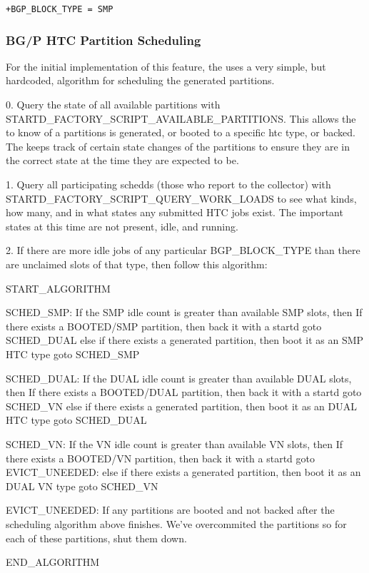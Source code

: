\begin{verbatim}
+BGP_BLOCK_TYPE = SMP
\end{verbatim}

\subsubsection{BG/P HTC Partition Scheduling}

For the initial implementation of this feature, the
 uses a very simple, but hardcoded, algorithm
for scheduling the generated partitions.

0. Query the state of all available partitions with
STARTD_FACTORY_SCRIPT_AVAILABLE_PARTITIONS. This allows the
 to know of a partitions is generated, or booted
to a specific htc type, or backed. The  keeps
track of certain state changes of the partitions to ensure they are in
the correct state at the time they are expected to be.

1. Query all participating schedds (those who report to the collector)
with STARTD_FACTORY_SCRIPT_QUERY_WORK_LOADS to see what kinds, how many,
and in what states any submitted HTC jobs exist. The important states
at this time are not present, idle, and running.

2. If there are more idle jobs of any particular BGP_BLOCK_TYPE than there
are unclaimed slots of that type, then follow this algorithm:

	START_ALGORITHM

	SCHED_SMP:
		If the SMP idle count is greater than available SMP slots, then
			If there exists a BOOTED/SMP partition, then
				back it with a startd
				goto SCHED_DUAL
			else if there exists a generated partition, then
				boot it as an SMP HTC type
				goto SCHED_SMP
	
	SCHED_DUAL:
		If the DUAL idle count is greater than available DUAL slots, then
			If there exists a BOOTED/DUAL partition, then
				back it with a startd
				goto SCHED_VN
			else if there exists a generated partition, then
				boot it as an DUAL HTC type
				goto SCHED_DUAL

	SCHED_VN:
		If the VN idle count is greater than available VN slots, then
			If there exists a BOOTED/VN partition, then
				back it with a startd
				goto EVICT_UNEEDED:
			else if there exists a generated partition, then
				boot it as an DUAL VN type
				goto SCHED_VN
				
	EVICT_UNEEDED:
		If any partitions are booted and not backed after the scheduling
		algorithm above finishes. We've overcommited the partitions so
		for each of these partitions, shut them down.

	END_ALGORITHM



